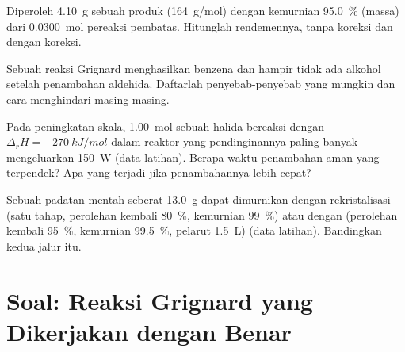 \begin{exercise}[$\star\star$]\label{exo:b2:lab-techniques-2:9}
Diperoleh \qty{4.10}{g} sebuah produk (\qty{164}{g/mol}) dengan kemurnian
95.0~\% (massa) dari \qty{0.0300}{mol} pereaksi pembatas. Hitunglah
rendemennya, tanpa koreksi dan dengan koreksi.
\end{exercise}

\begin{exercise}[$\star\star\star$]\label{exo:b2:lab-techniques-2:10}
Sebuah reaksi Grignard menghasilkan benzena dan hampir tidak ada alkohol
setelah penambahan aldehida. Daftarlah penyebab-penyebab yang mungkin dan
cara menghindari masing-masing.
\end{exercise}

\begin{exercise}[$\star\star\star$]\label{exo:b2:lab-techniques-2:11}
Pada peningkatan skala, \qty{1.00}{mol} sebuah halida bereaksi dengan
$\Delta_rH = \qty{-270}{kJ/mol}$ dalam reaktor yang pendinginannya paling
banyak mengeluarkan \qty{150}{W} (data latihan). Berapa waktu penambahan
aman yang terpendek? Apa yang terjadi jika penambahannya lebih cepat?
\end{exercise}

\begin{exercise}[$\star\star\star$]\label{exo:b2:lab-techniques-2:12}
Sebuah padatan mentah seberat \qty{13.0}{g} dapat dimurnikan dengan
rekristalisasi (satu tahap, perolehan kembali 80~\%, kemurnian
99~\%) atau dengan  (perolehan kembali 95~\%, kemurnian
99.5~\%, pelarut \qty{1.5}{L}) (data latihan). Bandingkan kedua jalur itu.
\end{exercise}

\section{Soal: Reaksi Grignard yang Dikerjakan dengan Benar}

